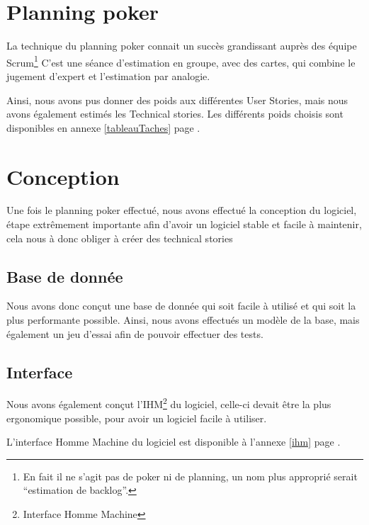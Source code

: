 \section{Planning poker}
	La technique du planning poker connait un succès grandissant auprès des équipe Scrum\footnote{En fait il ne s'agit pas de poker ni de planning, un nom plus approprié
	serait ``estimation de backlog''.}
	C'est une séance d'estimation en groupe, avec des cartes, qui combine le jugement d'expert et l'estimation par analogie.

	Ainsi, nous avons pus donner des poids aux différentes User Stories, mais nous avons également estimés les Technical stories.
	Les différents poids choisis sont disponibles en annexe \ref{tableauTaches} page \pageref{tableauTaches}.
\section{Conception}
	Une fois le planning poker effectué, nous avons effectué la conception du logiciel, étape extrêmement importante afin d'avoir un logiciel stable et facile à maintenir, cela nous à donc obliger à créer des 
technical stories

\subsection{Base de donnée}
	Nous avons donc conçut une base de donnée qui soit facile à utilisé et qui soit la plus performante possible. Ainsi, nous avons effectués un modèle de la base, mais également un jeu d'essai afin de pouvoir
effectuer des tests.

\subsection{Interface}
	Nous avons également conçut l'IHM\footnote{Interface Homme Machine} du logiciel, celle-ci devait être la plus ergonomique possible, pour avoir un logiciel facile à utiliser.

	L'interface Homme Machine du logiciel est disponible à l'annexe \ref{ihm} page \pageref{ihm}.	
